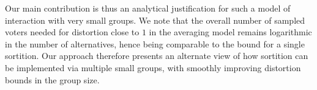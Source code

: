 Our main contribution is thus an analytical justification for such a model of interaction with very small groups. We note that the overall number of sampled voters needed for distortion close to $1$ in the averaging model remains logarithmic in the number of alternatives, hence being comparable to the bound for a single sortition. Our approach therefore presents an alternate view of how sortition can be implemented via multiple small groups, with smoothly improving distortion bounds in the group size.